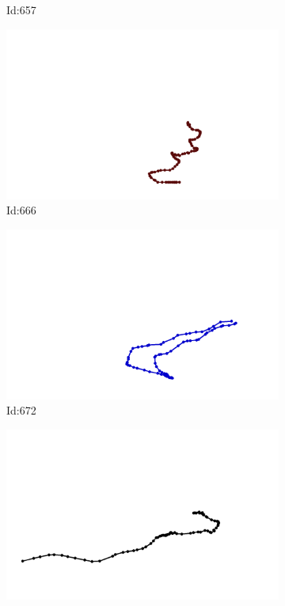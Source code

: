 \documentclass[12pt,twoside]{report}
\begin{document}
\begin{figure}
\begin{subfigure}[b]{0.20\textwidth}
\caption{Id:657}
\end{subfigure}
\begin{subfigure}[b]{0.20\textwidth}
\centering
\includegraphics[width=\textwidth]{../trajectories/666.png}
\caption{Id:666}
\end{subfigure}
\begin{subfigure}[b]{0.20\textwidth}
\centering
\includegraphics[width=\textwidth]{../trajectories/672.png}
\caption{Id:672}
\end{subfigure}
\begin{subfigure}[b]{0.20\textwidth}
\centering
\includegraphics[width=\textwidth]{../trajectories/682.png}

\end{subfigure}
\end{figure}
\end{document}
